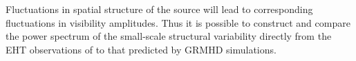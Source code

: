 


Fluctuations in spatial structure of the source will lead to corresponding fluctuations in visibility amplitudes. Thus it is possible to construct and compare the power spectrum of the small-scale structural variability directly from the EHT observations of \sgra to that predicted by GRMHD simulations.


